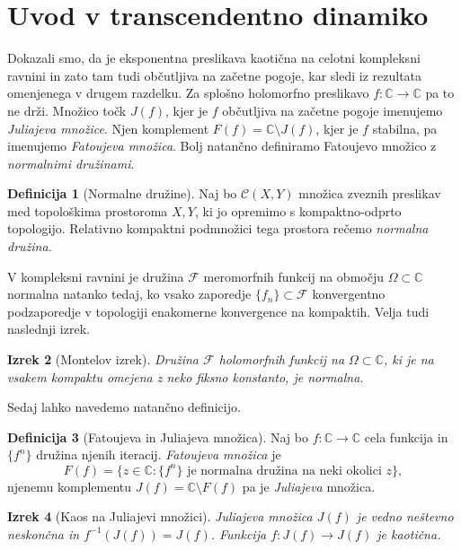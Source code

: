 \documentclass[a4paper, oneside]{amsart}
\newcommand{\CC}{\mathbb{C}}
\theoremstyle{plain}
\newtheorem{theorem}{Izrek}[section]
\theoremstyle{definition}
\newtheorem{definition}[theorem]{Definicija}
\begin{document}
\section{Uvod v transcendentno dinamiko}
\noindent Dokazali smo, da je eksponentna preslikava kaotična na celotni
kompleksni ravnini  in zato tam tudi občutljiva na začetne pogoje, kar sledi iz
rezultata omenjenega
v drugem razdelku. Za splošno holomorfno preslikavo \(f \colon \CC \to \CC\) pa
to ne drži. Množico točk \(J (f)\), kjer je \(f\) občutljiva na začetne pogoje
imenujemo \emph{Juliajeva množice}. Njen komplement \(F (f) = \CC \setminus J (f)\),
kjer je \(f\) stabilna, pa imenujemo \emph{Fatoujeva množica}.
Bolj natančno definiramo Fatoujevo množico z \emph{normalnimi družinami}.

\begin{definition}[Normalne družine]
    Naj bo \(\mathcal{C} (X, Y)\) množica zveznih preslikav med topološkima 
    prostoroma \(X, Y\), ki jo opremimo s kompaktno-odprto topologijo.
    Relativno kompaktni podmnožici tega prostora rečemo \emph{normalna družina}.
\end{definition}

V kompleksni ravnini je družina \(\mathcal{F}\) meromorfnih funkcij na območju
\(\Omega \subset \CC\) normalna natanko tedaj, ko vsako zaporedje
\(\{f_n\} \subset \mathcal{F}\) konvergentno podzaporedje v topologiji enakomerne
konvergence na kompaktih. Velja tudi naslednji izrek.

\begin{theorem}[Montelov izrek]
    Družina \(\mathcal{F}\) holomorfnih funkcij na \(\Omega \subset \CC\), ki je
    na vsakem kompaktu omejena z neko fiksno konstanto, je normalna.
\end{theorem}

Sedaj lahko navedemo natančno definicijo.

\begin{definition}[Fatoujeva in Juliajeva množica]
    Naj bo \(f \colon \CC \to \CC\) cela funkcija in \(\{ f^n \}\) družina njenih
    iteracij. \emph{Fatoujeva množica} je
    \[F (f) = \{ z \in \CC : \{ f^n \} \text{ je normalna družina na neki okolici } z \},\]
    njenemu komplementu \(J (f) = \CC \setminus F (f)\) pa je \emph{Juliajeva}
    množica.
\end{definition}

\begin{theorem}[Kaos na Juliajevi množici]
    Juliajeva množica \(J (f)\) je vedno neštevno neskončna in \(f^{-1} (J(f)) = J(f)\).
    Funkcija \(f \colon J (f) \to J (f)\) je kaotična.
\end{theorem}
\end{document}
